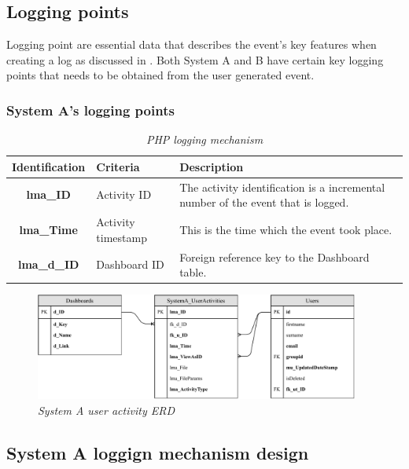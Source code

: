 \subsection{Logging points}
Logging point are essential data that describes the event's key features when creating a log as discussed in . Both System A and B have certain key logging points that needs to be obtained from the user generated event.

\subsubsection{System A's logging points}

\begin{table}[!htb]
	\centering
	\small
	\caption[Logging points]
	{\textit{PHP logging mechanism}}
	\label{tbl:PHP_LoggignMechanism}
	\begin{tabularx}{\textwidth}{|c|l|X|}
		\hline \textbf{Identification} & \textbf{Criteria} & \textbf{Description} \\
        \hline \textbf{lma\_ID} & Activity ID & The activity identification is a incremental number of the event that is logged.\\
        \hline \textbf{lma\_Time} & Activity timestamp & This is the time which the event took place.\\
        \hline \textbf{lma\_d\_ID} & Dashboard ID & Foreign reference key to the Dashboard table.\\
		\hline
	\end{tabularx}
\end{table}

\begin{figure}[!htb] %
	\centering %
	\includegraphics[width=0.95\textwidth]{Images/Chapter2/SystemA_ERD_Basic/SystemA_ERD_Basic.pdf}
	\caption[System A user activity ERD]
	{\textit{System A user activity ERD}}\label{fig:SystemA_Basic_ERD}
\end{figure}

\subsection{System A loggign mechanism design}

